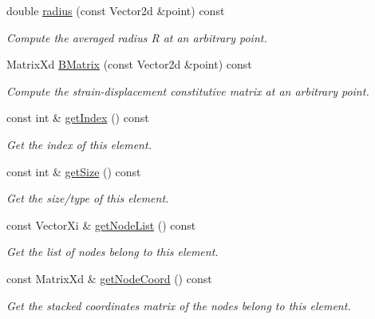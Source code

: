 \begin{DoxyCompactItemize}
$$double \mbox{\hyperlink{class_element_abab2c4f446d46785abcdfd17777e80d4}{radius}} (const Vector2d \&point) const
\begin{DoxyCompactList}\small\item\em Compute the averaged radius R at an arbitrary point. \end{DoxyCompactList}\item 
Matrix\+Xd \mbox{\hyperlink{class_element_a19f8ba5c4c7569c3bcccf1b422a7dd89}{B\+Matrix}} (const Vector2d \&point) const
\begin{DoxyCompactList}\small\item\em Compute the strain-\/displacement constitutive matrix at an arbitrary point. \end{DoxyCompactList}\item 
const int \& \mbox{\hyperlink{class_element_a85dc312253f1d39c29659393fbb1d485}{get\+Index}} () const
\begin{DoxyCompactList}\small\item\em Get the index of this element. \end{DoxyCompactList}\item 
const int \& \mbox{\hyperlink{class_element_a0221b246d9ca632136cc39790c46ee8f}{get\+Size}} () const
\begin{DoxyCompactList}\small\item\em Get the size/type of this element. \end{DoxyCompactList}\item 
const Vector\+Xi \& \mbox{\hyperlink{class_element_a763e0e4a46e68823903557a605dc5474}{get\+Node\+List}} () const
\begin{DoxyCompactList}\small\item\em Get the list of nodes belong to this element. \end{DoxyCompactList}\item 
const Matrix\+Xd \& \mbox{\hyperlink{class_element_a4d12b24e62592a1456e04d15872d5240}{get\+Node\+Coord}} () const
\begin{DoxyCompactList}\small\item\em Get the stacked coordinates matrix of the nodes belong to this element. \end{DoxyCompactList}\end{DoxyCompactItemize}
